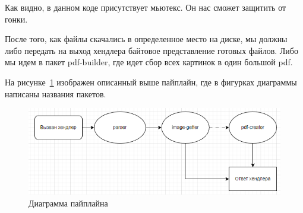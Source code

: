 Как видно, в данном коде присутствует мьютекс. Он нас сможет защитить от гонки.

После того, как файлы скачались в определенное место на диске, мы должны либо передать на выход хендлера байтовое представление готовых файлов.
Либо мы идем в пакет pdf-builder, где идет сбор всех картинок в один большой pdf.

На рисунке~\ref{pipeline-pic} изображен описанный выше пайплайн, где в фигурках диаграммы написаны названия пакетов.

\begin{figure}
    \includegraphics[scale=0.8]{imgs/pipeline}
    \caption{Диаграмма пайплайна}
    \label{pipeline-pic}
\end{figure}